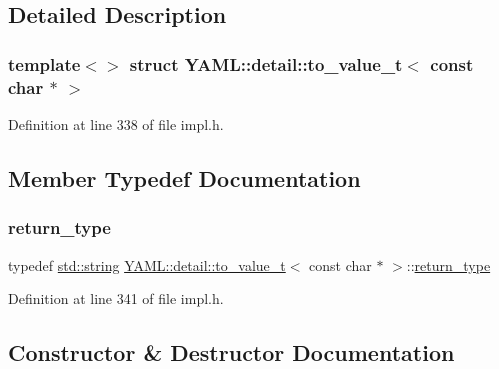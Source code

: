 \subsection{Detailed Description}
\subsubsection*{template$<$$>$\newline
struct Y\+A\+M\+L\+::detail\+::to\+\_\+value\+\_\+t$<$ const char $\ast$ $>$}



Definition at line 338 of file impl.\+h.



\subsection{Member Typedef Documentation}
\mbox{\label{struct_y_a_m_l_1_1detail_1_1to__value__t_3_01const_01char_01_5_01_4_a8ade7c2c24d4d21add88f0d6a5c1b79e}} 
\subsubsection{\texorpdfstring{return\_type}{return\_type}}
{\footnotesize\ttfamily typedef \mbox{\hyperlink{glad_8h_ac83513893df92266f79a515488701770}{std\+::string}} \mbox{\hyperlink{struct_y_a_m_l_1_1detail_1_1to__value__t}{Y\+A\+M\+L\+::detail\+::to\+\_\+value\+\_\+t}}$<$ const char $\ast$ $>$\+::\mbox{\hyperlink{struct_y_a_m_l_1_1detail_1_1to__value__t_3_01const_01char_01_5_01_4_a8ade7c2c24d4d21add88f0d6a5c1b79e}{return\+\_\+type}}}



Definition at line 341 of file impl.\+h.



\subsection{Constructor \& Destructor Documentation}
\mbox{\label{struct_y_a_m_l_1_1detail_1_1to__value__t_3_01const_01char_01_5_01_4_a1ff4094d7875561235cbee1848b0d67f}} 
